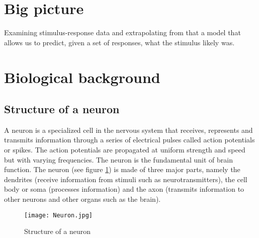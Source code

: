 
\section{Big picture}
 
Examining stimulus-response data and extrapolating from that a model
that allows us to predict, given a set of responses, what the stimulus 
likely was.





\section{Biological background}
\subsection{Structure of a neuron}
A neuron is a specialized cell in the nervous system that receives, represents and transmits information through a series of electrical pulses called action potentials or spikes. The action potentials are propagated at uniform strength and speed but with varying frequencies. The neuron is the fundamental unit of brain function. The neuron (see  figure \ref{fig:Neuron}) is made of three major parts, namely the dendrites (receive information from stimuli such as neurotransmitters), the cell body or soma (processes information) and the axon (transmits information to other neurons and other organs such as the brain).

\begin{figure}[h]
\caption{Structure of  a neuron}
\texttt{[image: Neuron.jpg]}
      \label{fig:Neuron}
\end{figure}


